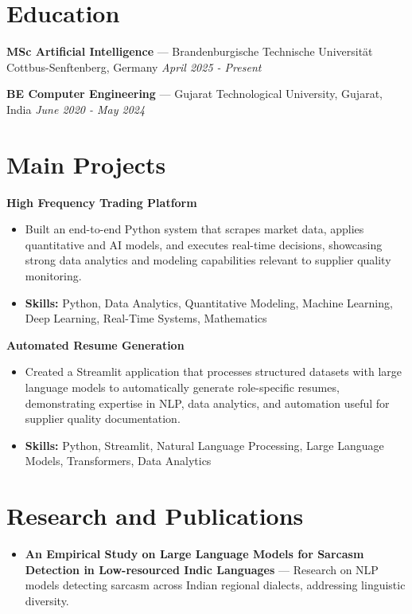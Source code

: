 \documentclass[a4paper,10pt]{article}
\begin{document}
\section*{Education}
\textbf{MSc Artificial Intelligence} — Brandenburgische Technische Universität Cottbus-Senftenberg, Germany \hfill \textit{April 2025 - Present}\par
\vspace{1.5pt}
\textbf{BE Computer Engineering} — Gujarat Technological University, Gujarat, India \hfill \textit{June 2020 - May 2024}\par

\section*{Main Projects}
\textbf{High Frequency Trading Platform}\par
\vspace{1pt}
\begin{itemize}
  \item Built an end-to-end Python system that scrapes market data, applies quantitative and AI models, and executes real-time decisions, showcasing strong data analytics and modeling capabilities relevant to supplier quality monitoring.
  \item \textbf{Skills:} Python, Data Analytics, Quantitative Modeling, Machine Learning, Deep Learning, Real-Time Systems, Mathematics
\end{itemize}
\vspace{3pt}
\textbf{Automated Resume Generation}\par
\vspace{1pt}
\begin{itemize}
  \item Created a Streamlit application that processes structured datasets with large language models to automatically generate role-specific resumes, demonstrating expertise in NLP, data analytics, and automation useful for supplier quality documentation.
  \item \textbf{Skills:} Python, Streamlit, Natural Language Processing, Large Language Models, Transformers, Data Analytics
\end{itemize}

\section*{Research and Publications}
\begin{itemize}
\item \textbf{An Empirical Study on Large Language Models for Sarcasm Detection in Low-resourced Indic Languages} — Research on NLP models detecting sarcasm across Indian regional dialects, addressing linguistic diversity.
\end{itemize}
\end{document}
